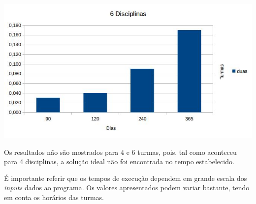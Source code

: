 \documentclass{llncs}
\begin{document}
\includegraphics[scale=0.85]{images/chart3.jpg}

Os resultados não são mostrados para 4 e 6 turmas, pois, tal como aconteceu para 4 disciplinas, a solução ideal não foi encontrada no tempo estabelecido.\par

É importante referir que os tempos de execução dependem em grande escala dos \textit{inputs} dados ao programa. Os valores apresentados podem variar bastante, tendo em conta os horários das turmas.
\end{document}
